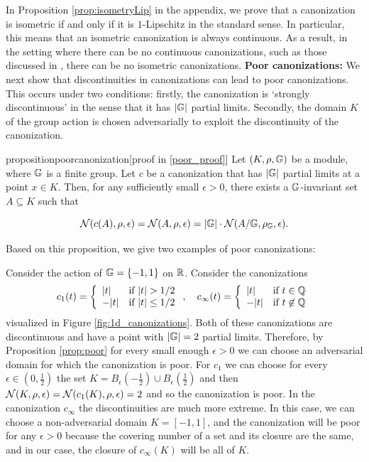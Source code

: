 \documentclass{article}
\begin{document}
In Proposition \ref{prop:isometryLip} in the appendix, we prove that a canonization is isometric if and only if it is $1$-Lipschitz in the standard sense. In particular, this means that an isometric canonization is always continuous. As a result, in the setting where there can be no continuous canonizations, such as those discussed in  \cite{dym2024equivariant,pmlr-v235-baker24a}, there can be no isometric canonizations.  
\textbf{Poor canonizations:} We next show that discontinuities in canonizations can lead to poor canonizations. This occurs under two conditions: firstly, the canonization is `strongly discontinuous' in the sense that it has $|\mathbb{G}|$ partial limits. Secondly, the domain $K$ of the group action is chosen adversarially to exploit the discontinuity of the canonization. 
\begin{restatable}{proposition}{poorcanonization}[proof in \ref{poor_proof}]
\label{prop:poor}
Let $(K,\rho,\mathbb{G})$ be a module, where $\mathbb{G}$ is a finite group. Let $c$ be a canonization that has $|\mathbb{G}|$ partial limits at a point $x\in K$. Then, for any sufficiently small $\epsilon>0$, there exists a $\mathbb{G}$-invariant set $A\subseteq K$ such that

$$
\mathcal{N}(c(A),\rho,\epsilon)
=
\mathcal{N}(A,\rho,\epsilon)
=
|\mathbb{G}|\cdot \mathcal{N}(A/\mathbb{G},\rho_{\mathbb{G}},\epsilon).
$$

\end{restatable}


Based on this proposition, we give two examples of poor canonizations:

\begin{example}\label{ex:sign_poor}
Consider the action of $\mathbb{G}=\{-1,1\}$ on $\mathbb{R} $. Consider the canonizations
$$c_1(t)=\twopartdef{|t|}{|t|>1/2}{-|t|}{|t|\leq 1/2}, \quad  c_\infty(t)=\twopartdef{|t|}{t\in \mathbb{Q}}{-|t|}{t\not \in \mathbb{Q}} $$
visualized in Figure \ref{fig:1d_canonizations}. Both of these canonizations are discontinuous and have a point with $|\mathbb{G}|=2 $ partial limits. Therefore, by  Proposition \ref{prop:poor} for every small enough $\epsilon>0$ we can choose an adversarial domain for which the canonization is poor. For $c_1$ we can choose for every $\epsilon\in (0,\frac{1}{2})$ the set  $K=B_\epsilon(-\frac{1}{2})\cup B_\epsilon(\frac{1}{2})$ and then $\mathcal{N}(K,\rho,\epsilon)=\mathcal{N}(c_1(K),\rho,\epsilon)=2$ and so the canonization is poor. 
In the canonization $c_\infty$ the discontinuities are much more extreme. In this case, we can choose a non-adversarial domain $K=[-1,1]$, and the canonization will be poor for any $\epsilon>0$ because the covering number of a set and its closure are the same, and in our case, the closure of $c_{\infty}(K)$ will be all of $K$. 
\end{example}
\end{document}
